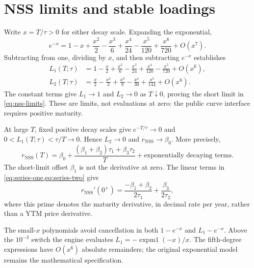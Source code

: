 \section{NSS limits and stable loadings}\label{sec:app-nss}
Write \(x=T/\tau>0\) for either decay scale. Expanding the exponential,
\[
e^{-x}=1-x+\frac{x^2}{2}-\frac{x^3}{6}
 +\frac{x^4}{24}-\frac{x^5}{120}+\frac{x^6}{720}+O(x^7).
\]
Subtracting from one, dividing by \(x\), and then subtracting \(e^{-x}\) establishes
\begin{align}
L_1(T;\tau)&=1-\frac{x}{2}+\frac{x^2}{6}-\frac{x^3}{24}
 +\frac{x^4}{120}-\frac{x^5}{720}+O(x^6),\label{eq:series-one}\\
L_2(T;\tau)&=\frac{x}{2}-\frac{x^2}{3}+\frac{x^3}{8}
 -\frac{x^4}{30}+\frac{x^5}{144}+O(x^6).\label{eq:series-two}
\end{align}
The constant terms give \(L_1\to1\) and \(L_2\to0\) as \(T\downarrow0\), proving the short limit in \cref{eq:nss-limits}. These are limits, not evaluations at zero: the public curve interface requires positive maturity.

At large \(T\), fixed positive decay scales give \(e^{-T/\tau}\to0\) and
\(0<L_1(T;\tau)<\tau/T\to0\). Hence \(L_2\to0\) and \(r_{\mathrm{NSS}}\to\beta_0\). More precisely,
\begin{equation}\label{eq:app-long}
r_{\mathrm{NSS}}(T)=\beta_0+
 \frac{(\beta_1+\beta_2)\tau_1+\beta_3\tau_2}{T}
 +\text{exponentially decaying terms}.
\end{equation}
The short-limit offset \(\beta_1\) is not the derivative at zero. The linear terms in \cref{eq:series-one,eq:series-two} give
\[
r_{\mathrm{NSS}}'(0^+)
=\frac{-\beta_1+\beta_2}{2\tau_1}+\frac{\beta_3}{2\tau_2},
\]
where this prime denotes the maturity derivative, in decimal rate per year, rather than a YTM price derivative.

The small-\(x\) polynomials avoid cancellation in both \(1-e^{-x}\) and \(L_1-e^{-x}\). Above the \(10^{-3}\) switch the engine evaluates \(L_1=-\operatorname{expm1}(-x)/x\). The fifth-degree expressions have \(O(x^6)\) absolute remainders; the original exponential model remains the mathematical specification.

